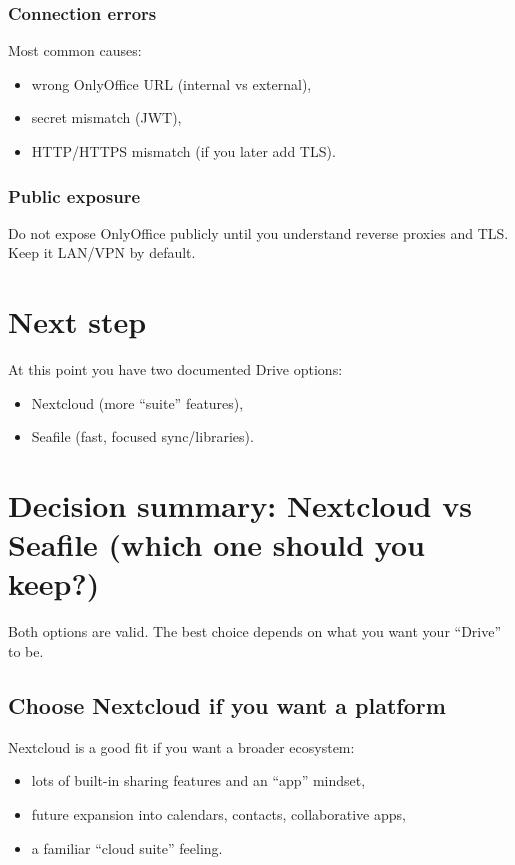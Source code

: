 \subsubsection*{Connection errors}
Most common causes:
\begin{itemize}[leftmargin=*]
  \item wrong OnlyOffice URL (internal vs external),
  \item secret mismatch (JWT),
  \item HTTP/HTTPS mismatch (if you later add TLS).
\end{itemize}

\subsubsection*{Public exposure}
Do not expose OnlyOffice publicly until you understand reverse proxies and TLS.
Keep it LAN/VPN by default.

\section{Next step}
At this point you have two documented Drive options:
\begin{itemize}[leftmargin=*]
  \item Nextcloud (more ``suite'' features),
  \item Seafile (fast, focused sync/libraries).
\end{itemize}

\section{Decision summary: Nextcloud vs Seafile (which one should you keep?)}
Both options are valid. The best choice depends on what you want your ``Drive'' to be.

\subsection*{Choose Nextcloud if you want a platform}
Nextcloud is a good fit if you want a broader ecosystem:
\begin{itemize}[leftmargin=*]
  \item lots of built-in sharing features and an ``app'' mindset,
  \item future expansion into calendars, contacts, collaborative apps,
  \item a familiar ``cloud suite'' feeling.
\end{itemize}

